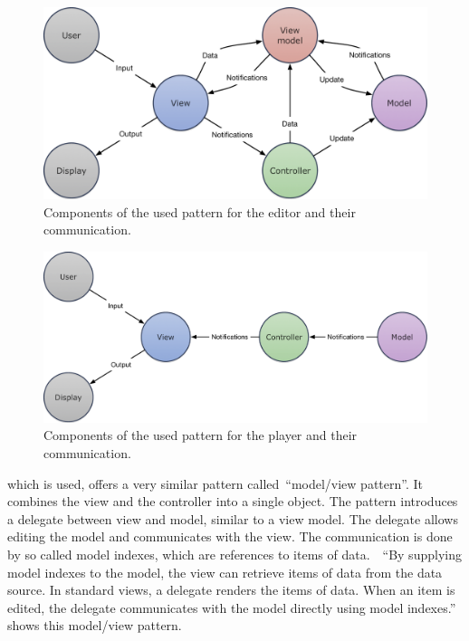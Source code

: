 \documentclass[%
    a4paper,    %
    justified,  %
    nobib,      %
    openany     %
]{tufte-book}
\makeatletter
\renewcommand{\label}[1]{\@tufte@label{##1}}%
\makeatother
\begin{document}
\begin{figure}[!htbp]
  \includegraphics[width=0.8\linewidth]{images/mvvmc}
  \caption{Components of the used pattern for the editor and their
    communication.}
\label{fig:software-design-pattern-components-editor}
\end{figure}

\begin{figure}[!htbp]
  \includegraphics[width=0.8\linewidth]{images/mvvmc-player}
  \caption{Components of the used pattern for the player and their
    communication.}
\label{fig:software-design-pattern-components-player}
\end{figure}

 which is used, offers a very similar pattern
called~\enquote{model/view pattern}. It combines the view and the controller
into a single object. The pattern introduces a delegate between view and model,
similar to a view model. The delegate allows editing the model and communicates
with the view. The communication is done by so called model indexes, which are
references to items of data.~\cite{qt-mvp-2017}~\enquote{By supplying model
indexes to the model, the view can retrieve items of data from the data source.
In standard views, a delegate renders the items of data. When an item is edited,
the delegate communicates with the model directly using model
indexes.}~\cite{qt-mvp-2017}  shows
this model/view pattern.
\end{document}
